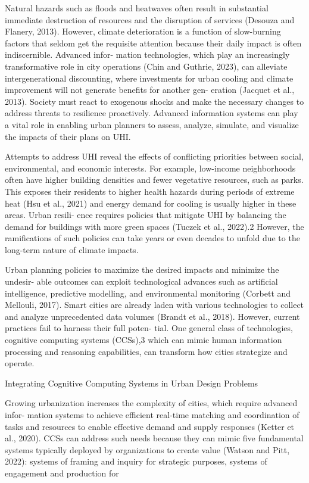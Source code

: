 \documentclass[10pt,a4paper]{article}
\begin{document}
Natural hazards such as ﬂoods and heatwaves often result in substantial immediate destruction of resources and the disruption of services (Desouza and Flanery, 2013). However, climate deterioration is a function of slow-burning factors that seldom get the requisite attention because their daily impact is often indiscernible. Advanced infor- mation technologies, which play an increasingly transformative role in city operations (Chin and Guthrie, 2023), can alleviate intergenerational discounting, where investments for urban cooling and climate improvement will not generate beneﬁts for another gen- eration (Jacquet et al., 2013). Society must react to exogenous shocks and make the necessary changes to address threats to resilience proactively. Advanced information systems can play a vital role in enabling urban planners to assess, analyze, simulate, and visualize the impacts of their plans on UHI.

Attempts to address UHI reveal the eﬀects of conﬂicting priorities between social, environmental, and economic interests. For example, low-income neighborhoods often have higher building densities and fewer vegetative resources, such as parks. This exposes their residents to higher health hazards during periods of extreme heat (Hsu et al., 2021) and energy demand for cooling is usually higher in these areas. Urban resili- ence requires policies that mitigate UHI by balancing the demand for buildings with more green spaces (Tuczek et al., 2022).2 However, the ramiﬁcations of such policies can take years or even decades to unfold due to the long-term nature of climate impacts.

Urban planning policies to maximize the desired impacts and minimize the undesir- able outcomes can exploit technological advances such as artiﬁcial intelligence, predictive modelling, and environmental monitoring (Corbett and Mellouli, 2017). Smart cities are already laden with various technologies to collect and analyze unprecedented data volumes (Brandt et al., 2018). However, current practices fail to harness their full poten- tial. One general class of technologies, cognitive computing systems (CCSs),3 which can mimic human information processing and reasoning capabilities, can transform how cities strategize and operate.

Integrating Cognitive Computing Systems in Urban Design Problems

Growing urbanization increases the complexity of cities, which require advanced infor- mation systems to achieve eﬃcient real-time matching and coordination of tasks and resources to enable eﬀective demand and supply responses (Ketter et al., 2020). CCSs can address such needs because they can mimic ﬁve fundamental systems typically deployed by organizations to create value (Watson and Pitt, 2022): systems of framing and inquiry for strategic purposes, systems of engagement and production for
\end{document}
